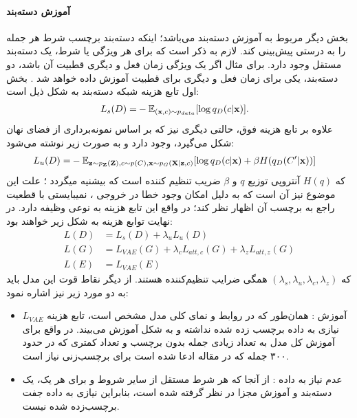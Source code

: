 \paragraph*{آموزش دسته‌بند}
بخش دیگر مربوط به آموزش دسته‌بند می‌باشد؛ اینکه دسته‌بند برچسب شرط هر جمله را به درستی پیش‌بینی کند. لازم به ذکر است که برای هر ویژگی یا شرط، یک دسته‌بند مستقل وجود دارد. برای مثال اگر یک ویژگی زمان فعل و دیگری قطبیت آن باشد، دو دسته‌بند، یکی برای زمان فعل و دیگری برای قطبیت آموزش داده خواهد شد \cite{toward}. بخش اول تابع هزینه شبکه دسته‌بند به شکل ذیل است:
\begin{equation}
\begin{split}
L_{s} (D) =& -\mathbb E_{({\bf x},c) \sim p_{data}} [\log q_D(c|{\bf x})].
\end{split}
\end{equation}
علاوه بر تابع هزینه فوق، حالتی دیگری نیز که بر اساس نمونه‌برداری از فضای نهان شکل می‌گیرد، وجود دارد و به صورت زیر نوشته می‌شود:
\begin{equation}
\begin{split}
L_{u} (D) =& -\mathbb E_{{\bf z} \sim p_{\bf Z}({\bf Z}), c \sim p(C), {\bf x} \sim p_G({\bf X}|{\bf z},c)} [\log q_D(c|{\bf x}) + \beta H(q_D(C'|{\bf x}))]
\end{split}
\end{equation}
که $H(q)$ آنتروپی توزیع $q$ و $\beta$ ضریب تنظیم کننده است که بیشنیه میگردد \cite{toward}؛ علت این موضوع نیز آن است که به دلیل امکان وجود خطا در خروجی \decoder{}، \classifier{} نمیبایستی با قطعیت راجع به برچسب آن اظهار نظر کند؛ در واقع این تابع هزینه به نوعی وظیفه \augmentation{} دارد.
در نهایت توابع هزینه به شکل زیر خواهند بود:
\begin{equation}
\begin{split}
L (D) &= L_{s} (D) + \lambda_u L_{u} (D)\\
L (G) &= L_{VAE} (G) + \lambda_c L_{att, c} (G) + \lambda_z L_{att, z} (G)\\
L (E) &= L_{VAE} (E)
\end{split}
\end{equation}
که $(\lambda_s, \lambda_u, \lambda_c , \lambda_z)$ همگی ضرایب تنظیم‌کننده هستند. از دیگر نقاط قوت این مدل باید به دو مورد زیر نیز اشاره نمود:
\renewcommand{\labelitemi}{$\bullet$}
\begin{itemize}
    \item
    
    آموزش
    :
    همان‌طور که در روابط و نمای کلی مدل مشخص است، تابع هزینه $L_{VAE}$ نیازی به داده برچسب زده شده نداشته و به شکل \semisupervised{} آموزش می‌بیند. در واقع برای آموزش کل مدل به تعداد زیادی جمله بدون برچسب و تعداد کمتری که در حدود ۳۰۰ جمله که در مقاله ادعا شده است برای برچسب‌زنی نیاز است.
    \item
    عدم نیاز به داده 
    :
    از آنجا که هر شرط مستقل از سایر شروط و برای هر یک، یک دسته‌بند و آموزش مجزا در نظر گرفته شده است، بنابراین نیازی به داده جفت برچسب‌زده شده نیست.
\end{itemize}

